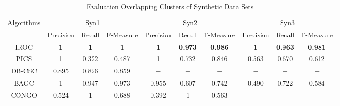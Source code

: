 \begin{table}[t]
\center\caption{Evaluation Overlapping Clusters of Synthetic Data Sets}
\begin{tabular}{|c|c|c|c|c|c|c|c|c|c|}
\hline
\multirow{2}{*}{Algorithms}	& \multicolumn{3}{|c|}{Syn1} & \multicolumn{3}{|c|}{Syn2} & \multicolumn{3}{|c|}{Syn3} \\
\cline{2-10} 
      & Precision & Recall & F-Measure& Precision & Recall & F-Measure& Precision & Recall & F-Measure\\
\hline     
 IROC & \textbf{1} &\textbf{1} & \textbf{1}  & \textbf{1} & \textbf{0.973}& \textbf{0.986} & \textbf{1}& \textbf{0.963} & \textbf{0.981} \\
\hline
 PICS & 1 & 0.322 & 0.487 & 1 & 0.732& 0.846 & 0.563 & 0.670& 0.612\\
\hline
 DB-CSC &  0.895 & 0.826& 0.859 &$-$&$-$& $-$ & $-$&$-$ &$-$  \\
\hline
 BAGC &  1 & 0.947 & 0.973 & 0.955 & 0.607& 0.742 & 0.490 & 0.722& 0.584\\
\hline
 CONGO &  0.524 & 1 & 0.688 & 0.392 & 1& 0.563 &$-$&$-$ &$-$ \\
\hline 
\end{tabular}
\label{tab:fmeasuresyn}
\end{table}


